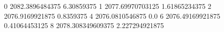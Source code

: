 0 2082.3896484375 6.30859375
1 2077.69970703125 1.61865234375
2 2076.9169921875 0.8359375
4 2076.0810546875 0.0
6 2076.49169921875 0.41064453125
8 2078.308349609375 2.227294921875
